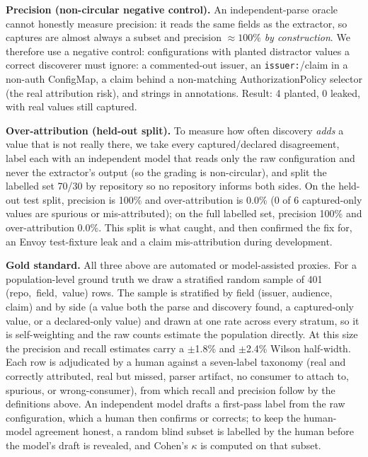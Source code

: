 \noindent\textbf{Precision (non-circular negative control).} An independent-parse
oracle cannot honestly measure precision: it reads the same fields as the
extractor, so captures are almost always a subset and precision $\approx 100\%$
\emph{by construction}. We therefore use a negative control: configurations with
planted distractor values a correct discoverer must ignore: a commented-out
issuer, an \texttt{issuer:}/claim in a non-auth ConfigMap, a claim behind a
non-matching AuthorizationPolicy selector (the real attribution risk), and strings
in annotations. Result: 4 planted, 0 leaked, with real values still captured.

\noindent\textbf{Over-attribution (held-out split).} To measure how often discovery
\emph{adds} a value that is not really there, we take every captured/declared
disagreement, label each with an independent model that reads only the raw
configuration and never the extractor's output (so the grading is non-circular),
and split the labelled set 70/30 by repository so no repository informs both sides.
On the held-out test split, precision is 100\% and over-attribution is 0.0\% (0 of 6
captured-only values are spurious or mis-attributed); on the full labelled set,
precision 100\% and over-attribution 0.0\%. This split is what caught, and then
confirmed the fix for, an Envoy test-fixture leak and a claim mis-attribution during
development.

\noindent\textbf{Gold standard.} All three above are automated or model-assisted
proxies. For a population-level ground truth we draw a stratified random sample of
401 \mbox{(repo, field, value)} rows. The sample is stratified by field (issuer,
audience, claim) and by side (a value both the parse and discovery found, a
captured-only value, or a declared-only value) and drawn at one rate across every
stratum, so it is self-weighting and the raw counts estimate the population directly.
At this size the precision and recall estimates carry a $\pm$1.8\% and $\pm$2.4\%
Wilson half-width. Each row is adjudicated by a human against a seven-label taxonomy
(real and correctly attributed, real but missed, parser artifact, no consumer to
attach to, spurious, or wrong-consumer), from which recall and precision follow by
the definitions above. An independent model drafts a first-pass label from the raw
configuration, which a human then confirms or corrects; to keep the human-model
agreement honest, a random blind subset is labelled by the human before the model's
draft is revealed, and Cohen's $\kappa$ is computed on that subset.

